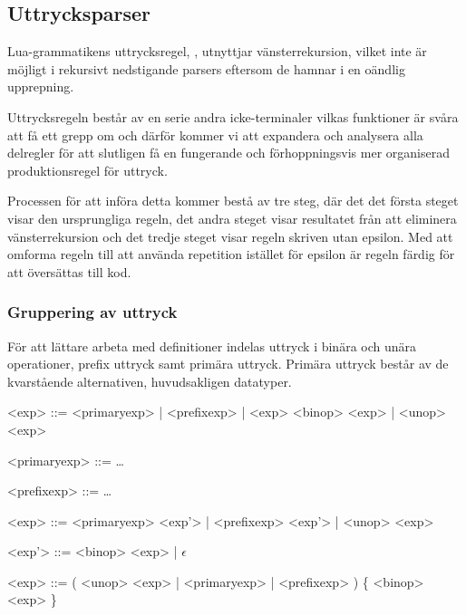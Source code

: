 \subsection{Uttrycksparser}

Lua-grammatikens uttrycksregel, , utnyttjar vänsterrekursion,
vilket inte är möjligt i rekursivt nedstigande parsers eftersom de hamnar i en
oändlig upprepning.

Uttrycksregeln består av en serie andra icke-terminaler vilkas funktioner är
svåra att få ett grepp om och därför kommer vi att expandera och analysera
alla delregler för att slutligen få en fungerande och förhoppningsvis mer
organiserad produktionsregel för uttryck.

Processen för att införa detta kommer bestå av tre steg, där det det första
steget visar den ursprungliga regeln, det andra steget visar resultatet från
att eliminera vänsterrekursion och det tredje steget visar regeln skriven utan epsilon.
Med att omforma regeln till att använda repetition istället för epsilon är
regeln färdig för att översättas till kod.

\subsubsection{Gruppering av uttryck}

För att lättare arbeta med definitioner indelas uttryck i binära och unära
operationer, prefix uttryck samt primära uttryck. Primära uttryck består av de
kvarstående alternativen, huvudsakligen datatyper.

\begin{description}
  \setlength{\grammarindent}{5em}
  \item[Ursprungsregel] \hfill
    \begin{grammar}
      \singlespace\small%
      \selectfont
      <exp> ::= <primaryexp> | <prefixexp> | <exp> <binop> <exp> | <unop> <exp>

      <primaryexp> ::= \ldots

      <prefixexp> ::= \ldots
    \end{grammar}

  \item[Eliminering av vänsterrekursion] \hfill
    \begin{grammar}
      \singlespace\small%
      \selectfont
      <exp> ::= <primaryexp> <exp'> | <prefixexp> <exp'> | <unop> <exp>

      <exp'> ::= <binop> <exp> | $\epsilon$
    \end{grammar}

  \item[Resultat] \hfill
    \begin{grammar}
      \singlespace\small%
      \selectfont
      <exp> ::= ( <unop> <exp> | <primaryexp> | <prefixexp> ) \{ <binop> <exp> \}
    \end{grammar}
\end{description}

